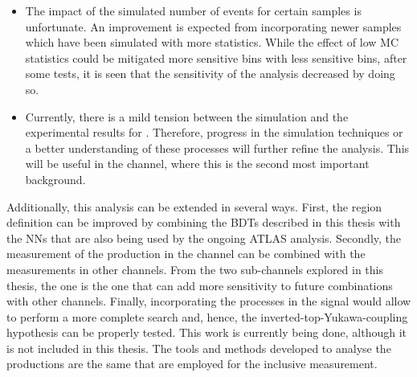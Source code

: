 \begin{itemize}
	\item The impact of the simulated number of events for certain samples is unfortunate. 
		An improvement is expected from incorporating newer samples which have been simulated with more statistics.
		While the effect of low MC statistics could be mitigated more sensitive bins with less sensitive bins,
		after some tests, it is seen that the sensitivity of the analysis decreased by doing so.
		
	\item Currently, there is a mild tension between the simulation and the experimental results for \ttW. 
		Therefore, progress in the simulation techniques or a better understanding of these processes will
		further refine the analysis. This will be useful in the \dilepSStau channel, where this is the second
		most important background.
\end{itemize}


Additionally, this analysis can be extended in several ways.
First, the region definition can be improved by combining the BDTs described in this thesis with the NNs that are also being used by the ongoing ATLAS analysis. 
Secondly, the measurement of the \tHq production in the \dileptau channel can be combined with the measurements in other channels. 
From the two sub-channels explored in this thesis, the \dilepSStau one is the one that can add more sensitivity to future combinations with other \tHq channels. 
Finally, incorporating the \tWH processes in the signal would allow to perform a more complete \tH search and, hence, the inverted-top-Yukawa-coupling hypothesis can be properly tested. This work is currently being done, although it is not included in this thesis. The tools and methods developed to analyse the \tHq productions are the same that are employed for the inclusive \tH measurement.



		
